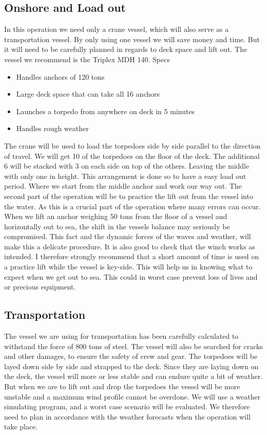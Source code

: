 \documentclass[DIV=calc, paper=a4, fontsize=13pt, twocolumn]{scrartcl}	 %
\begin{document}
\subsection*{Onshore and Load out}
In this operation we need only a crane vessel, which will also serve as a transportation vessel. By only using one vessel we will save money and time. But it will need to be carefully planned in regards to deck space and lift out. The vessel we recommend is the Triplex MDH 140. Specs
\begin{itemize}
\item Handles anchors of 120 tons
\item Large deck space that can take all 16 anchors 
\item Launches a torpedo from anywhere on deck in 5 minutes
\item Handles rough weather
\end{itemize}
The crane will be used to load the torpedoes side by side parallel to the direction of travel. We will get 10 of the torpedoes on the floor of the deck. The additional 6 will be stacked with 3 on each side on top of the others. Leaving the middle with only one in height. This arrangement is done so to have a easy load out period. Where we start from the middle anchor and work our way out. 
\newline
The second part of the operation will be to practice the lift out from the vessel into the water. As this is a crucial part of the operation where many errors can occur. When we lift an anchor weighing 50 tons from the floor of a vessel and horizontally out to sea, the shift in the vessels balance may seriously be compromised. This fact and the dynamic forces of the waves and weather, will make this a delicate procedure. It is also good to check that the winch works as intended. 
\newline
I therefore strongly recommend that a short amount of time is used on a practice lift while the vessel is key-side. This will help us in knowing what to expect when we get out to sea. This could in worst case prevent loss of lives and or precious equipment.



\subsection*{Transportation}
The vessel we are using for transportation has been carefully calculated to withstand the force of 800 tons of steel. The vessel will also be searched for cracks and other damages, to ensure the safety of crew and gear. The torpedoes will be layed down side by side and strapped to the deck. Since they are laying down on the deck, the vessel will more or less stable and can endure quite a bit of weather. But when we are to lift out and drop the torpedoes the vessel will be more unstable and a maximum wind profile cannot be overdone. We will use a weather simulating program, and a worst case scenario will be evaluated. We therefore need to plan in accordance with the weather forecasts when the operation will take place. 
\end{document}
